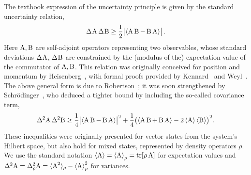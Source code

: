 The textbook expression of the uncertainty principle is given by the standard uncertainty relation,
\begin{equation}\label{eq:HUR}
  \sdev{\opa}\,\sdev{\opb}\ge \frac12\bigl| \expnr{\comm{\opa}{\opb}}\bigr|\,.
\end{equation}
Here $\operatorname{A},\operatorname{B}$ are self-adjoint operators representing two observables, whose standard deviations $\sdev{\opa}$, $\sdev{\opb}$ are constrained by the (modulus of the) expectation value of the commutator of $\operatorname{A},\operatorname{B}$. This relation was originally conceived for position and momentum by Heisenberg~\cite{Heisenberg1927-Wheeler+Zurek}, with formal proofs provided by Kennard~\cite{Kennard1927} and Weyl~\cite{Weyl1927}. The above general form is due to Robertson~\cite{Robertson1929}; it was soon strengthened by Schr\"odinger~\cite{Schrodinger1930}, who deduced a tighter bound by including the so-called covariance term,
\begin{equation}\label{eq:SUR}
  \var{\opa}\,\var{\opb}\ge\frac14\bigl| \expnr{\comm{\opa}{\opb}} \bigr|^2 + \frac14\bigl(\expnr{\acom\opa\opb}-2\expnr{\opa}\expnr{\opb}\bigr)^2.
\end{equation}
These inequalities were originally presented for vector states from the system's Hilbert space, but also hold for mixed states, represented by density operators $\rho$. We use the standard notation $\left\langle {\operatorname{A}}\right\rangle=\left\langle {\operatorname{A}}\right\rangle_\rho =\operatorname{tr}[\rho\operatorname{A}]$ for expectation values and $\var{\opa}=\varr{\opa}=\langle\opa^2\rangle_\rho-\expr{\opa}^2$ for variances. 

